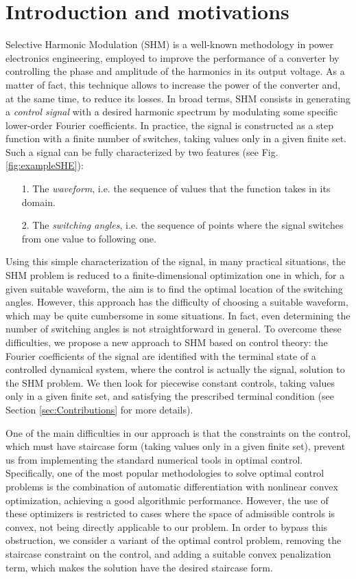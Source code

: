 \documentclass[twocolumn]{autart}    %
\begin{document}
\section{Introduction and motivations}\label{Section1}

Selective Harmonic Modulation (SHM) \cite{Sun1992,Sun1996} is a well-known methodology in power electronics engineering, employed to improve the performance of a converter by controlling the phase and amplitude of the harmonics in its output voltage. As a matter of fact, this technique allows to increase the power of the converter and, at the same time, to reduce its losses. In broad terms, SHM consists in generating a \textit{control signal} with a desired harmonic spectrum by modulating some specific lower-order Fourier coefficients. In practice, the signal is constructed as a step function with a finite number of switches, taking values only in a given finite set. Such a signal can be fully characterized by two features (see Fig. \ref{fig:exampleSHE}): 
\begin{itemize}
	\item[1.] The \textit{waveform}, i.e. the sequence of values that the function takes in its domain.
	\item[2.] The \textit{switching angles}, i.e. the sequence of points where the signal switches from one value to following one. 
\end{itemize}

Using this simple characterization of the signal, in many practical situations, the SHM problem is reduced to a finite-dimensional optimization one in which, for a given suitable waveform, the aim is to find the optimal location of the switching angles. However, this approach has the  difficulty of choosing a suitable waveform,  which may be quite cumbersome in some situations.  In fact, even determining the number of switching angles is not straightforward in general. To overcome these difficulties,  we propose a new approach to SHM based on control theory: the Fourier coefficients of the signal are identified with the terminal state of a controlled dynamical system, where the control is actually the signal, solution to the SHM problem. We then look for piecewise constant controls, taking values only in a given finite set, and satisfying the prescribed terminal condition (see Section \ref{sec:Contributions} for more details). 

One of the main difficulties in our approach is  that the constraints on the control, which must have staircase form (taking values only in a given finite set),  prevent us from implementing the standard numerical tools in optimal control. Specifically, one of the most popular methodologies to solve optimal control problems is the combination of automatic differentiation with nonlinear convex optimization, achieving a good algorithmic performance. However, the use of these optimizers is restricted to cases where the space of admissible controls is convex,  not being directly applicable to our problem. In order to bypass this obstruction, we consider a variant of the optimal control problem, removing the staircase constraint on the control, and adding a suitable convex penalization term, which makes the solution have the desired staircase form.
\end{document}
